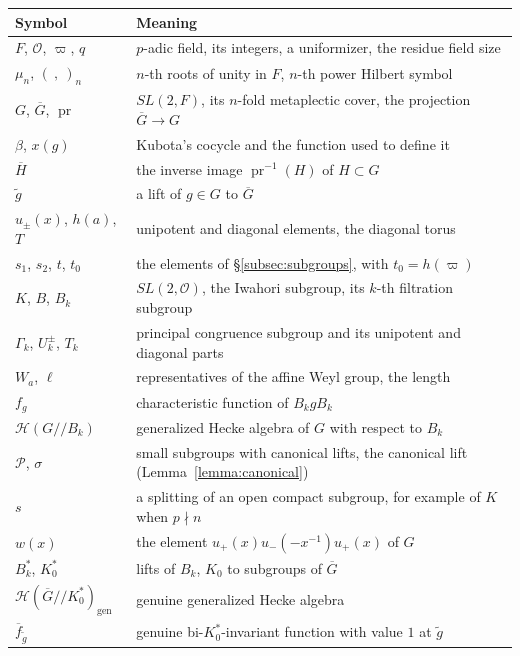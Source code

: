 \documentclass[12pt,letterpaper]{amsart}
\numberwithin{equation}{section}
\theoremstyle{definition}
\theoremstyle{remark}
\DeclareMathOperator{\pr}{pr}
\newcommand{\cO}{\mathcal{O}}
\newcommand{\cH}{\mathcal{H}}
\newcommand{\cP}{\mathcal{P}}
\newcommand{\Gbar}{\overline{G}}
\newcommand{\gen}{\mathrm{gen}}
\newcommand{\fbar}{\overline{f}}
\begin{document}
\medskip
\begin{center}
\begin{tabular}{@{}p{}p{}@{}}
\toprule
Symbol & Meaning \\
\midrule
$F$, $\cO$, $\varpi$, $q$ & $p$-adic field, its integers, a uniformizer,
the residue field size \\
$\mu_n$, $(\ ,\ )_n$ & $n$-th roots of unity in $F$, $n$-th power
Hilbert symbol \\
$G$, $\Gbar$, $\pr$ & $SL(2,F)$, its $n$-fold metaplectic cover, the
projection $\Gbar\to G$ \\
$\beta$, $x(g)$ & Kubota's cocycle and the function used to define it \\
$\overline{H}$ & the inverse image $\pr^{-1}(H)$ of $H\subset G$ \\
$\tilde g$ & a lift of $g\in G$ to $\Gbar$ \\
$u_\pm(x)$, $h(a)$, $T$ & unipotent and diagonal elements, the diagonal
torus \\
$s_1$, $s_2$, $t$, $t_0$ & the elements of
\S\ref{subsec:subgroups}, with $t_0=h(\varpi)$ \\
$K$, $B$, $B_k$ & $SL(2,\cO)$, the Iwahori subgroup, its $k$-th
filtration subgroup \\
$\Gamma_k$, $U^\pm_k$, $T_k$ & principal congruence subgroup and its
unipotent and diagonal parts \\
$W_a$, $\ell$ & representatives of the affine Weyl group, the length \\
$f_g$ & characteristic function of $B_kgB_k$ \\
$\cH(G/\!/B_k)$ & generalized Hecke algebra of $G$ with respect to
$B_k$ \\
$\cP$, $\sigma$ & small subgroups with canonical lifts, the canonical
lift (Lemma~\ref{lemma:canonical}) \\
$s$ & a splitting of an open compact subgroup, for example of $K$ when
$p\nmid n$ \\
$w(x)$ & the element $u_+(x)u_-(-x^{-1})u_+(x)$ of $G$ \\
$B_k^*$, $K_0^*$ & lifts of $B_k$, $K_0$ to subgroups of $\Gbar$ \\
$\cH(\Gbar/\!/K_0^*)_{\gen}$ & genuine generalized Hecke algebra \\
$\fbar_{\tilde g}$ & genuine bi-$K_0^*$-invariant function with value
$1$ at $\tilde g$ \\
\bottomrule
\end{tabular}
\end{center}
\end{document}
